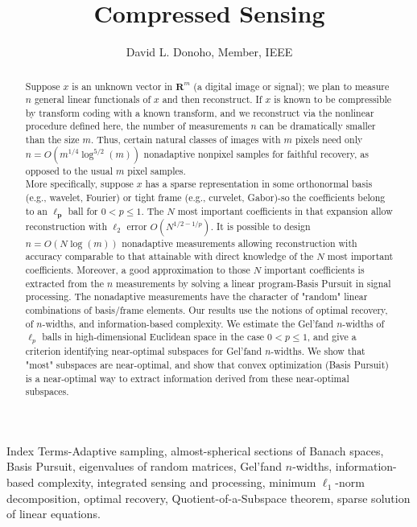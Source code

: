 \documentclass[10pt]{article}
\title{Compressed Sensing }
\author{David L. Donoho, Member, IEEE}
\date{}
\begin{document}
\maketitle


\begin{abstract}
Suppose $x$ is an unknown vector in $\boldsymbol{R}^{m}$ (a digital image or signal); we plan to measure $n$ general linear functionals of $x$ and then reconstruct. If $x$ is known to be compressible by transform coding with a known transform, and we reconstruct via the nonlinear procedure defined here, the number of measurements $n$ can be dramatically smaller than the size $m$. Thus, certain natural classes of images with $m$ pixels need only $n=O\left(m^{1 / 4} \log ^{5 / 2}(m)\right)$ nonadaptive nonpixel samples for faithful recovery, as opposed to the usual $m$ pixel samples.\\
More specifically, suppose $x$ has a sparse representation in some orthonormal basis (e.g., wavelet, Fourier) or tight frame (e.g., curvelet, Gabor)-so the coefficients belong to an $\ell_{\boldsymbol{p}}$ ball for $0<p \leq 1$. The $N$ most important coefficients in that expansion allow reconstruction with $\ell_{2}$ error $O\left(N^{1 / 2-1 / p}\right)$. It is possible to design $n=O(N \log (m))$ nonadaptive measurements allowing reconstruction with accuracy comparable to that attainable with direct knowledge of the $N$ most important coefficients. Moreover, a good approximation to those $N$ important coefficients is extracted from the $n$ measurements by solving a linear program-Basis Pursuit in signal processing. The nonadaptive measurements have the character of "random" linear combinations of basis/frame elements. Our results use the notions of optimal recovery, of $n$-widths, and information-based complexity. We estimate the Gel'fand $n$-widths of $\ell_{p}$ balls in high-dimensional Euclidean space in the case $0<p \leq 1$, and give a criterion identifying near-optimal subspaces for Gel'fand $n$-widths. We show that "most" subspaces are near-optimal, and show that convex optimization (Basis Pursuit) is a near-optimal way to extract information derived from these near-optimal subspaces.
\end{abstract}

Index Terms-Adaptive sampling, almost-spherical sections of Banach spaces, Basis Pursuit, eigenvalues of random matrices, Gel'fand $n$-widths, information-based complexity, integrated sensing and processing, minimum $\ell_{1}$-norm decomposition, optimal recovery, Quotient-of-a-Subspace theorem, sparse solution of linear equations.
\end{document}
